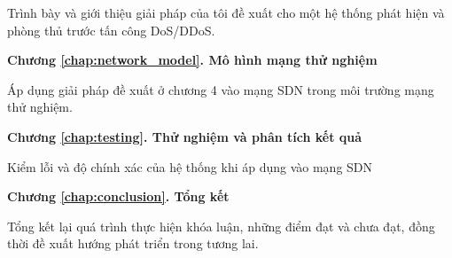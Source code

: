 Trình bày và giới thiệu giải pháp của tôi đề xuất cho một hệ thống phát hiện và phòng thủ trước tấn công DoS/DDoS.

\textbf{Chương \ref{chap:network_model}. Mô hình mạng thử nghiệm}

Áp dụng giải pháp đề xuất ở chương 4 vào mạng SDN trong môi trường mạng thử nghiệm.

\textbf{Chương \ref{chap:testing}. Thử nghiệm và phân tích kết quả}

Kiểm lỗi và độ chính xác của hệ thống khi áp dụng vào mạng SDN

\textbf{Chương \ref{chap:conclusion}. Tổng kết}

Tổng kết lại quá trình thực hiện khóa luận, những điểm đạt và chưa đạt, đồng thời đề xuất hướng phát triển trong tương lai. 